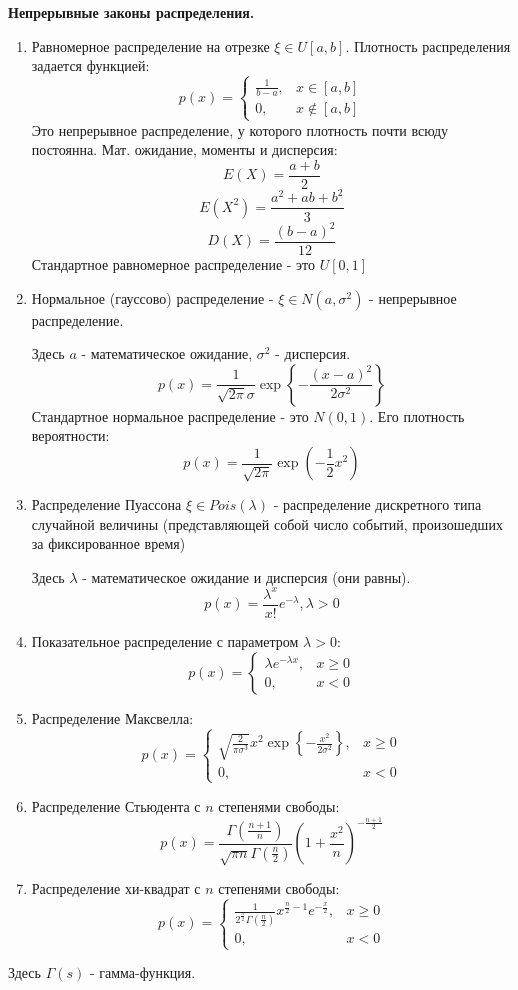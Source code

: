\noindent \textbf{Непрерывные законы распределения.}
\begin{enumerate}
	\item Равномерное распределение на отрезке $\xi \in U[a, b]$. Плотность распределения задается функцией:
	\[
	p(x) =
	\begin{cases}
		\frac{1}{b-a}, &x \in [a, b] \\
		0, &x \notin [a, b]
	\end{cases}
	\]
	Это непрерывное распределение, у которого плотность почти всюду постоянна.
	Мат. ожидание, моменты и дисперсия:
	\[E(X)=\dfrac{a+b}{2}\]
	\[E(X^2)=\dfrac{a^2+ab+b^2}{3}\]
	\[D(X)=\dfrac{(b-a)^2}{12}\]
	Стандартное равномерное распределение - это $U[0,1]$
	\item Нормальное (гауссово) распределение - $\xi \in N(a, \sigma^2)$ - непрерывное распределение.

	Здесь $a$ - математическое ожидание, $ \sigma^2$ - дисперсия.
	\[ p(x) = \frac{1}{\sqrt{2 \pi} \sigma} \exp \left\{ - \frac{(x-a)^2}{2 \sigma^2} \right\} \]
	Стандартное нормальное распределение - это $N(0,1)$.
	Его плотность вероятности:
	\[ p(x) = \dfrac{1}{\sqrt{2\pi}}\exp(-\frac{1}{2}x^2)\]
	
	\item Распределение Пуассона $\xi \in Pois(\lambda)$ - распределение дискретного типа случайной величины (представляющей собой число событий, произошедших за фиксированное время)
	
	Здесь $\lambda$ - математическое ожидание и дисперсия (они равны).
	\[p(x)=\frac{\lambda^x}{x!}e^{-\lambda}, \lambda>0\]
	\item Показательное распределение с параметром $\lambda > 0$:
	\[
	p(x) =
	\begin{cases}
		\lambda e^{- \lambda x}, &x \ge 0 \\
		0, &x  < 0
	\end{cases}
	\]
	\item Распределение Максвелла:
	\[
	p(x) =
	\begin{cases}
		\sqrt{\frac{2}{\pi \sigma^3}} x^2 \exp \left\{ - \frac{x^2}{2 \sigma^2} \right\}, &x \ge 0 \\
		0, &x < 0
	\end{cases}
	\]
	\item Распределение Стьюдента с $n$ степенями свободы:
	\[ p(x) = \frac{\Gamma \left( \frac{n+1}{n} \right)}{\sqrt{\pi n} \Gamma \left(\frac{n}{2}\right)} \left( 1 +  \frac{x^2}{n} \right)^{-\frac{n+1}{2}} \]
	\item Распределение хи-квадрат с $n$ степенями свободы:
	\[
	p(x) =
	\begin{cases}
		\frac{1}{2^{\frac{n}{2}} \Gamma \left(\frac{n}{2}\right)} x^{\frac{n}{2} - 1} e^{- \frac{x}{2}}, &x \ge 0 \\
		0, &x < 0
	\end{cases}
	\]
\end{enumerate}
Здесь $\Gamma(s)$ - гамма-функция.

